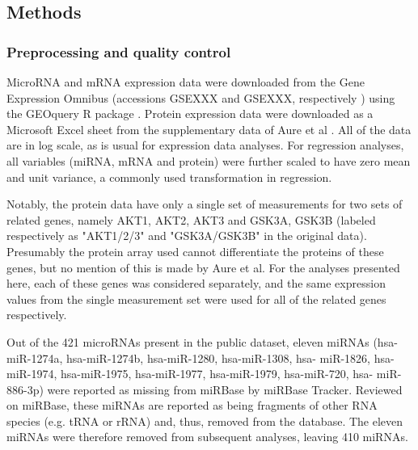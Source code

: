





\subsection{Methods}


\subsubsection{Preprocessing and quality control}

MicroRNA and mRNA expression data were downloaded from the Gene Expression
Omnibus (accessions GSEXXX and GSEXXX, respectively \citep{Edgar2002}) using
the GEOquery R package \citep{GEOquery}. Protein expression data were
downloaded as a Microsoft Excel sheet from the supplementary data of Aure et
al \citep{Aure2015}. All of the data are in log scale, as is usual for
expression data analyses. For regression analyses, all variables (miRNA, mRNA
and protein) were further scaled to have zero mean and unit variance,
a commonly used transformation in regression.

Notably, the protein data have only a single set of measurements for two sets
of related genes, namely AKT1, AKT2, AKT3 and GSK3A, GSK3B (labeled
respectively as "AKT1/2/3" and "GSK3A/GSK3B" in the original data). Presumably
the protein array used cannot differentiate the proteins of these genes, but
no mention of this is made by Aure et al. For the analyses presented here,
each of these genes was considered separately, and the same expression values
from the single measurement set were used for all of the related genes
respectively.

Out of the 421 microRNAs present in the public dataset, eleven miRNAs (hsa-
miR-1274a, hsa-miR-1274b, hsa-miR-1280, hsa-miR-1308, hsa- miR-1826, hsa-
miR-1974, hsa-miR-1975, hsa-miR-1977, hsa-miR-1979, hsa-miR-720, hsa-
miR-886-3p) were reported as missing from miRBase by miRBase Tracker. Reviewed
on miRBase, these miRNAs are reported as being fragments of other RNA species
(e.g. tRNA or rRNA) and, thus, removed from the database. The eleven miRNAs
were therefore removed from subsequent analyses, leaving 410 miRNAs.


